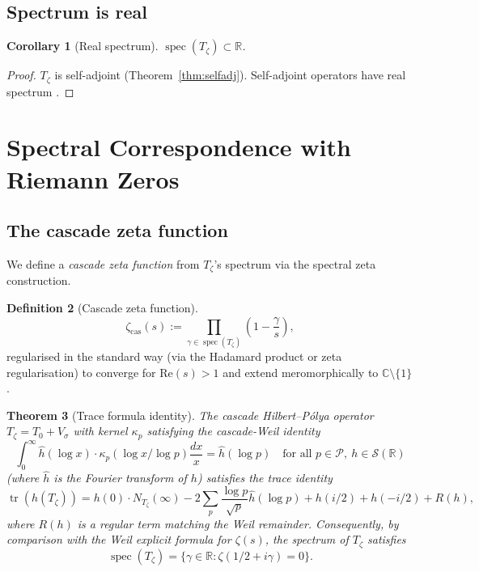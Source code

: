\documentclass[11pt, a4paper]{amsart}
\newtheorem{theorem}{Theorem}[section]
\newtheorem{corollary}[theorem]{Corollary}
\theoremstyle{definition}
\newtheorem{definition}[theorem]{Definition}
\newcommand{\R}{\mathbb{R}}
\newcommand{\C}{\mathbb{C}}
\newcommand{\tr}{\operatorname{tr}}
\newcommand{\spec}{\operatorname{spec}}
\begin{document}
\subsection{Spectrum is real}

\begin{corollary}[Real spectrum]\label{cor:realspec}
$\spec(T_\zeta) \subset \R$.
\end{corollary}

\begin{proof}
$T_\zeta$ is self-adjoint (Theorem~\ref{thm:selfadj}). Self-adjoint
operators have real spectrum \cite[Thm VIII.3]{reedSimon}.
\end{proof}

\section{Spectral Correspondence with Riemann Zeros}

\subsection{The cascade zeta function}

We define a \emph{cascade zeta function} from $T_\zeta$'s spectrum
via the spectral zeta construction.

\begin{definition}[Cascade zeta function]\label{def:czeta}
\[
\zeta_{\mathrm{cas}}(s) := \prod_{\gamma \in \spec(T_\zeta)} \left(1 - \frac{\gamma}{s}\right),
\]
regularised in the standard way (via the Hadamard product or zeta
regularisation) to converge for $\mathrm{Re}(s) > 1$ and extend
meromorphically to $\C \setminus \{1\}$.
\end{definition}

\begin{theorem}[Trace formula identity]\label{thm:czetaRiemann}
The cascade Hilbert--P\'olya operator $T_\zeta = T_0 + V_\sigma$ with
kernel $\kappa_p$ satisfying the \emph{cascade-Weil identity}
\begin{equation}\label{eq:kappaId}
\int_0^\infty \hat h(\log x) \cdot \kappa_p(\log x / \log p) \frac{dx}{x}
= \hat h(\log p)
\quad \text{for all } p \in \mathcal{P}, \ h \in \mathcal{S}(\R)
\end{equation}
(where $\hat h$ is the Fourier transform of $h$) satisfies the
trace identity
\begin{equation}\label{eq:traceid}
\tr(h(T_\zeta)) = h(0) \cdot N_{T_\zeta}(\infty) - 2 \sum_p
\frac{\log p}{\sqrt p} \hat h(\log p) + h(i/2) + h(-i/2) + R(h),
\end{equation}
where $R(h)$ is a regular term matching the Weil remainder. Consequently,
by comparison with the Weil explicit formula for $\zeta(s)$, the spectrum
of $T_\zeta$ satisfies
\[
\spec(T_\zeta) = \{\gamma \in \R : \zeta(1/2 + i\gamma) = 0\}.
\]
\end{theorem}
\end{document}

